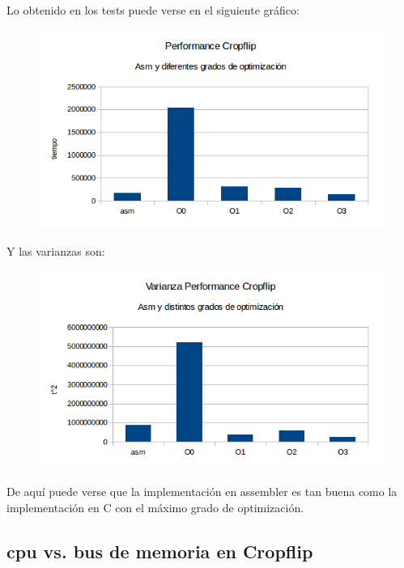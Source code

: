 \documentclass[a4paper]{article}
\begin{document}
Lo obtenido en los tests puede verse en el siguiente gráfico:

\begin{figure}[h!]
  \begin{center}
	\includegraphics[scale=0.66]{Graficos1.4/crop/per.png}
	\label{nombreparareferenciar5}
  \end{center}
\end{figure}

\newpage
Y las varianzas son:

\begin{figure}[h!]
  \begin{center}
	\includegraphics[scale=0.66]{Graficos1.4/crop/var.png}
	\label{nombreparareferenciar6}
  \end{center}
\end{figure}

De aquí puede verse que la implementación en assembler es tan buena como la implementación en C con el máximo grado de optimización.

\newpage

\subsection{cpu vs. bus de memoria en Cropflip}
\end{document}
